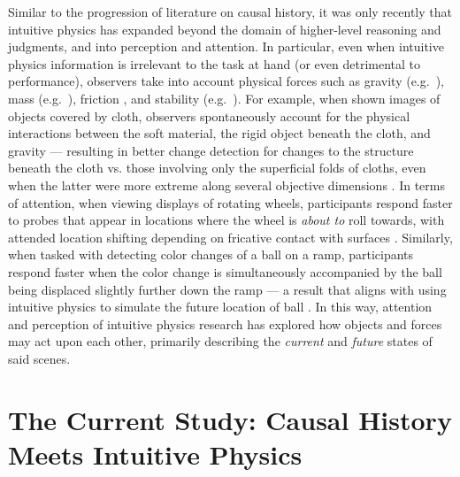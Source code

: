 Similar to the progression of literature on causal history, it was only recently that  intuitive physics has expanded beyond the domain of higher-level reasoning and judgments, and into perception and attention.  In particular, even when intuitive physics information is irrelevant to the task at hand (or even detrimental to performance), observers take into account physical forces such as gravity (e.g.~\cite{wong_seeing_2023, mitko_visual_2023}), mass (e.g.~\cite{deeb_velocity_2024}), friction \parencite{nguyen_rotating_2024}, and stability (e.g.~\cite{wong_unconscious_2024, firestone_seeing_2017}).  For example, when shown images of objects covered by cloth, observers spontaneously account for the physical interactions between the soft material, the rigid object beneath the cloth, and gravity --- resulting in better change detection for changes to the structure beneath the cloth vs. those involving only the superficial folds of cloths, even when the latter were more extreme along several objective dimensions \parencite{wong_seeing_2023}.  In terms of attention, when viewing displays of rotating wheels, participants respond faster to probes that appear in locations where the wheel is \textit{about to} roll towards, with attended location shifting depending on fricative contact with surfaces \parencite{nguyen_rotating_2024}.  Similarly, when tasked with detecting color changes of a ball on a ramp, participants respond faster when the color change is simultaneously accompanied by the ball being displaced slightly further down the ramp --- a result that aligns with using intuitive physics to simulate the future location of ball \parencite{mitko_visual_2023}.  In this way, attention and perception of intuitive physics research has explored how objects and forces may act upon each other, primarily describing the \textit{current} and \textit{future} states of said scenes.  

\section{The Current Study: Causal History Meets Intuitive Physics}


